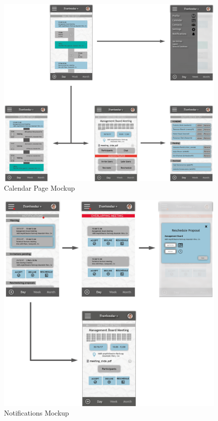 \begin{figure}[h]
\centering\includegraphics[width = \textwidth, scale = 0.3]{Images/Mockups/CalendarPage+.png}{}
\caption{Calendar Page Mockup}
\end{figure}

\begin{figure}[h]
\centering\includegraphics[scale = 0.3]{Images/Mockups/Notifications+.png}{}
\caption{Notifications Mockup}
\end{figure}

